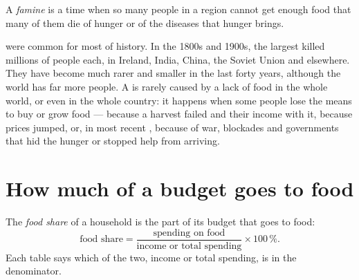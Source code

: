 \begin{definition}[Famine]\label{def:g6:food-and-energy:famine}
A \emph{famine} is a time when so many people in a region cannot
get enough food that many of them die of hunger or of the diseases that hunger
brings.
\end{definition}

 were common for most of history. In the 1800s and 1900s, the largest
 killed millions of people each, in Ireland, India, China, the Soviet
Union and elsewhere. They have become much rarer and smaller in the last forty
years, although the world has far more people. A  is rarely caused by a
lack of food in the whole world, or even in the whole country: it happens when
some people lose the means to buy or grow food --- because a harvest failed and
their income with it, because prices jumped, or, in most recent , because
of war, blockades and governments that hid the hunger or stopped help from
arriving.

\section{How much of a budget goes to food}

\begin{definition}\label{def:g6:food-and-energy:food-share}
The \emph{food share} of a household is the part
of its budget that goes to food:
\[
  \text{food share} = \frac{\text{spending on food}}{\text{income or total spending}}
  \times 100\,\%.
\]
Each table says which of the two, income or total spending, is in the
denominator.
\end{definition}


